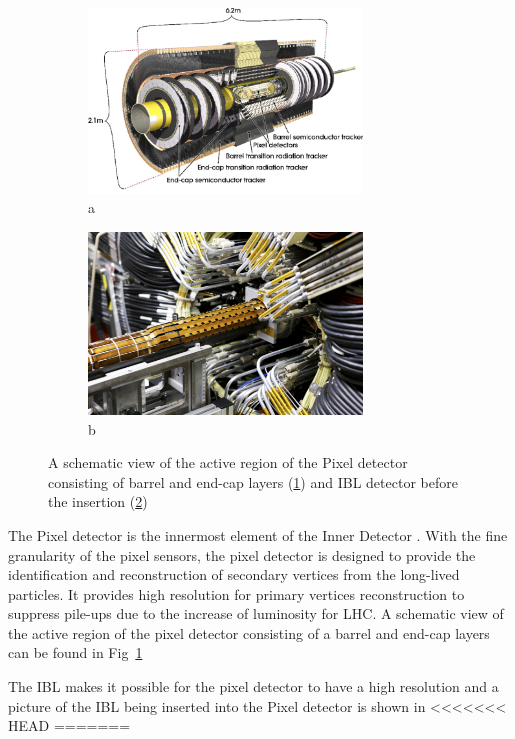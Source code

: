 \begin{figure}[htbp!]
\begin{subfigure}{.5\textwidth}
 \centering
 \includegraphics[width=0.8\textwidth]{chapters/c4/figures/pixel}
 \caption{a}
 \label{fig:pixel1}
\end{subfigure}%
\begin{subfigure}{.5\textwidth}
 \centering
 \includegraphics[width=0.8\textwidth]{chapters/c4/figures/IBL}
 \caption{b}
 \label{fig:pixel2}
\end{subfigure}
 \caption{A schematic view of the active region of the Pixel detector consisting of barrel and end-cap layers (\ref{fig:pixel1}) and IBL detector before the insertion (\ref{fig:pixel2})}
\label{fig:pixel}
\end{figure}
\par The Pixel detector is the innermost element of the Inner Detector \cite{Hirono:2641635}. With the fine granularity of the pixel sensors, 
the pixel detector is designed to provide the identification and reconstruction of secondary vertices from the long-lived particles. It provides high resolution for primary vertices reconstruction to suppress pile-ups due to the increase of luminosity for LHC. A schematic view of the active region of the pixel detector consisting of a barrel and end-cap layers can be found in Fig~\ref{fig:pixel1}
\par The IBL makes it possible for the pixel detector to have a high resolution and a picture of the IBL being inserted into the Pixel detector is shown in 
<<<<<<< HEAD
=======

